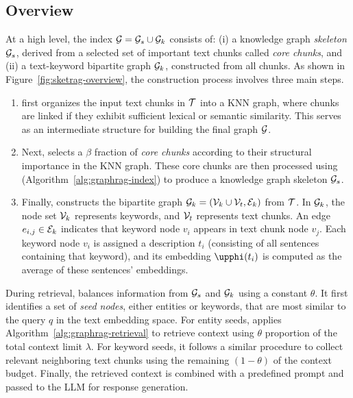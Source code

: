 \subsection{Overview}
At a high level, the \textgraph{} index $\mathcal{G} = \mathcal{G}_s \cup \mathcal{G}_k$ consists of: (i) a knowledge graph \textit{skeleton} $\mathcal{G}_s$, derived from a selected set of important text chunks called \textit{core chunks}, and (ii) a text-keyword bipartite graph $\mathcal{G}_k$, constructed from all chunks. As shown in Figure~\ref{fig:sketrag-overview}, the construction process involves three main steps.
\begin{enumerate}
[topsep=2pt,itemsep=1pt,parsep=0pt,partopsep=0pt,leftmargin=15pt]
    \item \sketrag first organizes the input text chunks in $\mathcal{T}$ into a KNN graph, where chunks are linked if they exhibit sufficient lexical or semantic similarity. This serves as an intermediate structure for building the final graph $\mathcal{G}$. 
    \item Next, \sketrag selects a $\beta$ fraction of \textit{core chunks} according to their structural importance in the KNN graph. These core chunks are then processed using \graphindex (Algorithm~\ref{alg:graphrag-index}) to produce a knowledge graph skeleton $\mathcal{G}_s$. 
    \item Finally, \sketrag constructs the bipartite graph $\mathcal{G}_k = (\mathcal{V}_k \cup \mathcal{V}_t, \mathcal{E}_k)$ from $\mathcal{T}$. In $\mathcal{G}_k$, the node set $\mathcal{V}_k$ represents keywords, and $\mathcal{V}_t$ represents text chunks. An edge $e_{i,j} \in \mathcal{E}_k$ indicates that keyword node $v_i$ appears in text chunk node $v_j$. Each keyword node $v_i$ is assigned a description $t_i$ (consisting of all sentences containing that keyword), and its embedding $\temb{t_i}$ is computed as the average of these sentences' embeddings.
\end{enumerate}
During retrieval, \sketrag balances information from $\mathcal{G}_s$ and $\mathcal{G}_k$ using a constant $\theta$. It first identifies a set of \textit{seed nodes}, either entities or keywords, that are most similar to the query $q$ in the text embedding space. For entity seeds, \sketrag applies Algorithm~\ref{alg:graphrag-retrieval} to retrieve context using $\theta$ proportion of the total context limit $\lambda$. For keyword seeds, it follows a similar procedure to collect relevant neighboring text chunks using the remaining $(1-\theta)$ of the context budget. Finally, the retrieved context is combined with a predefined prompt and passed to the LLM for response generation.



